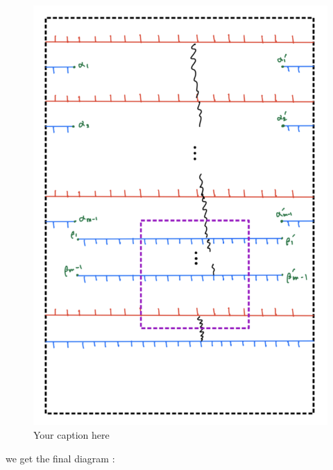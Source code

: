 \begin{figure}[H] %
    \centering
    \includegraphics[width=\linewidth]{diagrams/lemma7/5.png} %
    \caption{Your caption here}
    \label{fig:your-label}
\end{figure}

we get the final diagram :

